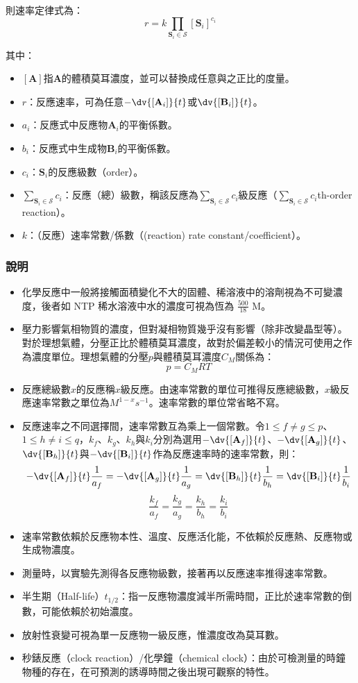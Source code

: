 \documentclass[a4paper,12pt]{report}
\begin{document}
則速率定律式為：
\[r=k\prod_{\mathbf{S}_i\in\mathscr{S}}[\mathbf{S}_i]^{c_i}\]

其中：
\begin{itemize}
\item $[\mathbf{A}]$指$\mathbf{A}$的體積莫耳濃度，並可以替換成任意與之正比的度量。
\item $r$：反應速率，可為任意$-\dv{[\mathbf{A}_i]}{t}$或$\dv{[\mathbf{B}_i]}{t}$。
\item $a_i$：反應式中反應物$\mathbf{A}_i$的平衡係數。
\item $b_i$：反應式中生成物$\mathbf{B}_i$的平衡係數。
\item $c_i$：$\mathbf{S}_i$的反應級數（order）。
\item $\sum_{\mathbf{S}_i\in\mathscr{S}}c_i$：反應（總）級數，稱該反應為$\sum_{\mathbf{S}_i\in\mathscr{S}}c_i$級反應（$\sum_{\mathbf{S}_i\in\mathscr{S}}c_i$th-order reaction）。
\item $k$：（反應）速率常數/係數（(reaction) rate constant/coefficient）。
\end{itemize}
\subsubsection{說明}
\begin{itemize}
\item 化學反應中一般將接觸面積變化不大的固體、稀溶液中的溶劑視為不可變濃度，後者如 NTP 稀水溶液中水的濃度可視為恆為 $\frac{500}{18}$ M。
\item 壓力影響氣相物質的濃度，但對凝相物質幾乎沒有影響（除非改變晶型等）。對於理想氣體，分壓正比於體積莫耳濃度，故對於偏差較小的情況可使用之作為濃度單位。理想氣體的分壓$p$與體積莫耳濃度$C_M$關係為：
\[p=C_MRT\]
\item 反應總級數$x$的反應稱$x$級反應。由速率常數的單位可推得反應總級數，$x$級反應速率常數之單位為$M^{1-x}s^{-1}$。速率常數的單位常省略不寫。
\item 反應速率之不同選擇間，速率常數互為乘上一個常數。令$1\leq f\neq g\leq p$、$1\leq h\neq i\leq q$，$k_f$、$k_g$、$k_h$與$k_i$分別為選用$-\dv{[\mathbf{A}_f]}{t}$、$-\dv{[\mathbf{A}_g]}{t}$、$\dv{[\mathbf{B}_h]}{t}$與$-\dv{[\mathbf{B}_i]}{t}$作為反應速率時的速率常數，則：
\[-\dv{[\mathbf{A}_f]}{t}\frac{1}{a_f}=-\dv{[\mathbf{A}_g]}{t}\frac{1}{a_g}=\dv{[\mathbf{B}_h]}{t}\frac{1}{b_h}=\dv{[\mathbf{B}_i]}{t}\frac{1}{b_i}\]
\[\frac{k_f}{a_f}=\frac{k_g}{a_g}=\frac{k_h}{b_h}=\frac{k_i}{b_i}\]
\item 速率常數依賴於反應物本性、溫度、反應活化能，不依賴於反應熱、反應物或生成物濃度。
\item 測量時，以實驗先測得各反應物級數，接著再以反應速率推得速率常數。
\item 半生期（Half-life）$t_{1/2}$：指一反應物濃度減半所需時間，正比於速率常數的倒數，可能依賴於初始濃度。
\item 放射性衰變可視為單一反應物一級反應，惟濃度改為莫耳數。
\item 秒錶反應（clock reaction）/化學鐘（chemical clock）：由於可檢測量的時鐘物種的存在，在可預測的誘導時間之後出現可觀察的特性。
\end{itemize}
\end{document}
